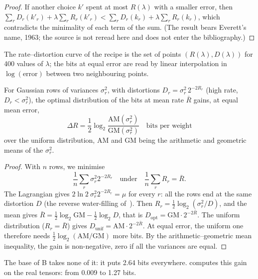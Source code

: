 \begin{proof}
If another choice $k'$ spent at most $R(\lambda)$ with a smaller error, then $\sum_r D_r(k'_r) + \lambda \sum_r R_r(k'_r) < \sum_r D_r(k_r) + \lambda \sum_r R_r(k_r)$, which contradicts the minimality of each term of the sum. (The result bears Everett's name, 1963; the source is not reread here and does not enter the bibliography.)
\end{proof}

The rate--distortion curve of the recipe is the set of points $(R(\lambda), D(\lambda))$ for 400 values of $\lambda$; the bits at equal error are read by linear interpolation in $\log(\text{error})$ between two neighbouring points.

\begin{proposition}\label{t3gen:prop:remplissage}
For Gaussian rows of variances $\sigma_r^2$, with distortions $D_r = \sigma_r^2\, 2^{-2R_r}$ (high rate, $D_r < \sigma_r^2$), the optimal distribution of the bits at mean rate $\bar R$ gains, at equal mean error,
\begin{equation}\label{t3gen:eq:remplissage}
\Delta R = \frac12 \log_2 \frac{\mathrm{AM}(\sigma_r^2)}{\mathrm{GM}(\sigma_r^2)} \quad \text{bits per weight}
\end{equation}
over the uniform distribution, AM and GM being the arithmetic and geometric means of the $\sigma_r^2$.
\end{proposition}

\begin{proof}
With $n$ rows, we minimise
\[ \frac1n\sum_r \sigma_r^2 2^{-2R_r} \quad \text{under} \quad \frac1n\sum_r R_r = \bar R . \]
The Lagrangian gives $2\ln 2\ \sigma_r^2 2^{-2R_r} = \mu$ for every $r$: all the rows end at the same distortion $D$ (the reverse water-filling of~\cite[§\,10.3.3]{cover2006}). Then $R_r = \frac12 \log_2(\sigma_r^2/D)$, and the mean gives $\bar R = \frac12 \log_2 \mathrm{GM} - \frac12 \log_2 D$, that is $D_{\mathrm{opt}} = \mathrm{GM}\cdot 2^{-2\bar R}$. The uniform distribution ($R_r = \bar R$) gives $D_{\mathrm{unif}} = \mathrm{AM}\cdot 2^{-2\bar R}$. At equal error, the uniform one therefore needs $\frac12\log_2(\mathrm{AM}/\mathrm{GM})$ more bits. By the arithmetic--geometric mean inequality, the gain is non-negative, zero if all the variances are equal.
\end{proof}

The base of B takes none of it: it puts 2.64 bits everywhere.  computes this gain on the real tensors: from 0.009 to 1.27 bits.

